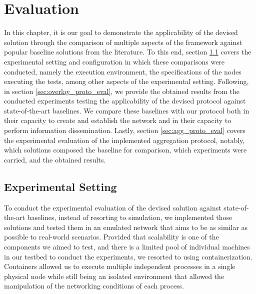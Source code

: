 

\chapter{Evaluation}
\label{cha:evaluation}

In this chapter, it is our goal to demonstrate the applicability of the devised solution through the comparison of multiple aspects of the framework against popular baseline solutions from the literature. To this end, section \ref{sec:exp_setting_conf} covers the experimental setting and configuration in which these comparisons were conducted, namely the execution environment, the specifications of the nodes executing the tests, among other aspects of the experimental setting. Following, in section \ref{sec:overlay_proto_eval}, we provide the obtained results from the conducted experiments testing the applicability of the devised protocol against state-of-the-art baselines. We compare these baselines with our protocol both in their capacity to create and establish the network and in their capacity to perform information dissemination. Lastly, section \ref{sec:agg_proto_eval} covers the experimental evaluation of the implemented aggregation protocol, notably, which solutions composed the baseline for comparison, which experiments were carried, and the obtained results.

\section{Experimental Setting} \label{sec:exp_setting_conf}

To conduct the experimental evaluation of the devised solution against state-of-the-art baselines, instead of resorting to simulation, we implemented those solutions and tested them in an emulated network that aims to be as similar as possible to real-world scenarios. Provided that scalability is one of the components we aimed to test, and there is a limited pool of individual machines in our testbed to conduct the experiments, we resorted to using containerization. Containers allowed us to execute multiple independent processes in a single physical node while still being an isolated environment that allowed the manipulation of the networking conditions of each process. 

